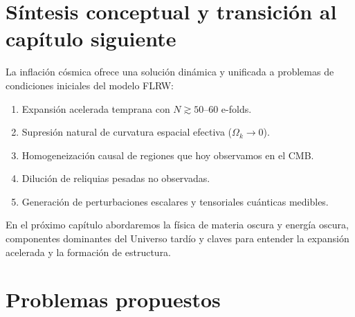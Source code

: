 \section{Síntesis conceptual y transición al capítulo siguiente}
\label{sec:sintesis_cap12}

La inflación cósmica ofrece una solución dinámica y unificada a problemas de condiciones iniciales del modelo FLRW:
\begin{enumerate}[leftmargin=2em, label=\textbf{\arabic*.}]
  \item Expansión acelerada temprana con $N\gtrsim 50$--$60$ e-folds.
  \item Supresión natural de curvatura espacial efectiva ($\Omega_k\to0$).
  \item Homogeneización causal de regiones que hoy observamos en el CMB.
  \item Dilución de reliquias pesadas no observadas.
  \item Generación de perturbaciones escalares y tensoriales cuánticas medibles.
\end{enumerate}

En el próximo capítulo abordaremos la física de materia oscura y energía oscura, componentes dominantes del Universo tardío y claves para entender la expansión acelerada y la formación de estructura.

\section*{Problemas propuestos}

